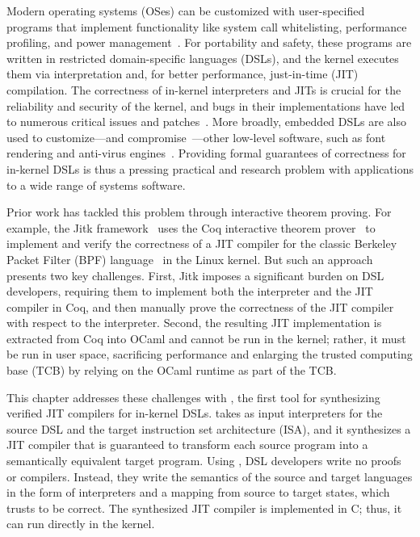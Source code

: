 Modern operating systems (OSes) can be customized with user-specified programs
that implement functionality like system call whitelisting, performance
profiling, and power management~\cite{engler:vcode,fleming:ebpf,mccanne:bpf}.
For portability and safety, these programs are written in restricted
domain-specific languages (DSLs), and the kernel executes them via
interpretation and, for better performance, just-in-time (JIT) compilation. The
correctness of in-kernel interpreters and JITs is crucial for the reliability
and security of the kernel, and bugs in their implementations have led to
numerous critical issues and patches~\cite{gpz:1454,paul:cve-2020-8835}.
More broadly, embedded DSLs are
also used to customize---and compromise~\cite{blazakis:jit-spraying,kocher:spectre}---other low-level software, such as font
rendering and anti-virus engines~\cite{chen:vmsec}. Providing formal guarantees
of correctness for in-kernel DSLs is thus a pressing practical and research
problem with applications to a wide range of systems software.\tighten

Prior work has tackled this problem through interactive theorem proving. For
example, the Jitk framework~\cite{wang:jitk} uses the Coq interactive theorem
prover~\cite{coq} to implement and verify the correctness of a JIT compiler for
the classic Berkeley Packet Filter (BPF) language~\cite{mccanne:bpf} in the
Linux kernel. But such an approach presents two key challenges. First, Jitk
imposes a significant burden on DSL developers, requiring them to implement both
the interpreter and the JIT compiler in Coq, and then manually prove the
correctness of the JIT compiler with respect to the interpreter. Second, the
resulting JIT implementation is extracted from Coq into OCaml and cannot be run
in the kernel; rather, it must be run in user space, sacrificing performance and
enlarging the trusted computing base (TCB) by relying on the OCaml runtime as
part of the TCB\@.\tighten

This chapter addresses these challenges with \jitsynth, the first tool for
synthesizing verified JIT compilers for in-kernel DSLs. \jitsynth takes as input
interpreters for the source DSL and the target instruction set architecture
(ISA), and it synthesizes a JIT compiler that is guaranteed to transform each
source program into a semantically equivalent target program. Using \jitsynth,
DSL developers write no proofs or compilers.
Instead, they write the semantics of the source and target
languages in the form of interpreters and a mapping from source to target states,
which \jitsynth trusts to be correct. The
synthesized JIT compiler is implemented in C; thus, it can run directly in the
kernel.\tighten

